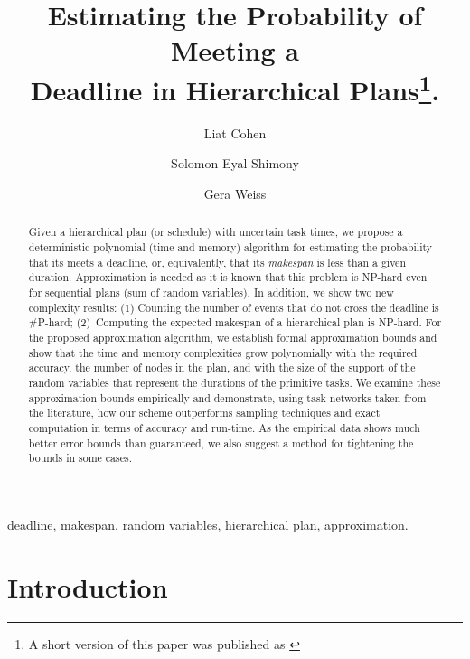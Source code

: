 \documentclass[review]{elsarticle}
\begin{document}
\begin{frontmatter}

\title{Estimating the Probability of Meeting a \\ Deadline in Hierarchical Plans\footnote{A short version of this paper was published as \cite{cohen2015estimating}}.}

\author{Liat Cohen}
\author{Solomon Eyal Shimony}
\author{Gera Weiss}
\address{Computer Science Department\\
Ben Gurion University of The Negev\\
Beer-Sheva, Israel 84105\\}

\begin{abstract}
		Given a hierarchical plan (or schedule) with uncertain task times, we propose a deterministic polynomial (time and memory) algorithm for estimating the probability that its meets a deadline, or, equivalently, that its {\em makespan} is less than a given duration. Approximation is needed as it is known that this problem is NP-hard even for sequential plans (sum of random variables). In addition, we show two new complexity results: (1) Counting the number of events that do not cross the deadline is \#P-hard; (2)~Computing the expected makespan of a hierarchical plan is NP-hard. For the proposed approximation algorithm, we establish formal approximation bounds and show that the time and memory complexities grow polynomially with the required accuracy, the number of nodes in the plan, and with the size of the support of the random variables that represent the durations of the primitive tasks. We examine these approximation bounds empirically and demonstrate, using task networks taken from the literature, how our scheme outperforms sampling techniques and exact computation in terms of accuracy and run-time. As the empirical data shows much better error bounds than guaranteed, we also suggest a method for tightening the bounds in some cases. 
\end{abstract}  

\begin{keyword}
deadline, makespan, random variables, hierarchical plan, approximation.

\end{keyword}

\end{frontmatter}

\linenumbers



\section{Introduction}
\end{document}
